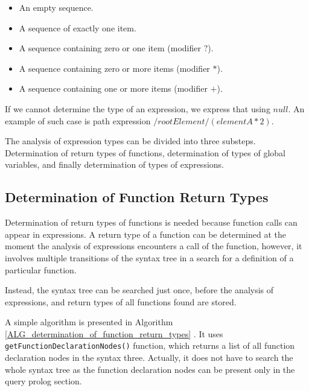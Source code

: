 \begin{itemize}
\item An empty sequence.
\item A sequence of exactly one item.
\item A sequence containing zero or one item (modifier $?$).
\item A sequence containing zero or more items (modifier $*$).
\item A sequence containing one or more items (modifier $+$).
\end{itemize}

If we cannot determine the type of an expression, we express that using $null$. An example of such case is path expression $/rootElement/(elementA * 2)$. 

The analysis of expression types can be divided into three substeps. Determination of return types of functions, determination of types of global variables, and finally determination of types of expressions.


\subsection{Determination of Function Return Types}
Determination of return types of functions is needed because function calls can appear in expressions. A return type of a function can be determined at the moment the analysis of expressions encounters a call of the function, however, it involves multiple transitions of the syntax tree in a search for a definition of a particular function.

Instead, the syntax tree can be searched just once, before the analysis of expressions, and return types of all functions found are stored.

A simple algorithm is presented in Algorithm \ref{ALG_determination_of_function_return_types} . It uses \texttt{getFunctionDeclarationNodes()} function, which returns a list of all function declaration nodes in the syntax three. Actually, it does not have to search the whole syntax tree as the function declaration nodes can be present only in the query prolog section. 

